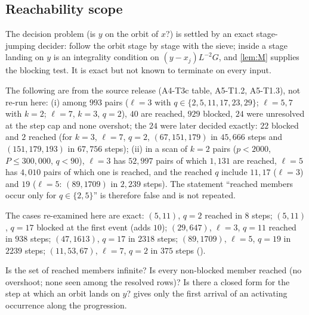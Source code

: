 \subsection{Reachability scope}
The decision problem (is $y$ on the orbit of $x$?) is settled by an exact stage-jumping decider: follow the orbit stage by stage with the sieve; inside a stage landing on $y$ is an integrality condition on $(y-x_j)L^{-2}G$, and \cref{lem:M} supplies the blocking test. It is exact but not known to terminate on every input.
\begin{proposition}\label{prop:reach}
The following are  from the source release (A4-T3c table, A5-T1.2, A5-T1.3), not re-run here:
(i) among $993$ pairs ($\ell=3$ with $q\in\{2,5,11,17,23,29\}$; $\ell=5,7$ with $k=2$; $\ell=7$, $k=3$, $q=2$), $40$ are reached, $929$ blocked, $24$ were unresolved at the step cap and none overshot; the $24$ were later decided exactly: $22$ blocked and $2$ reached (for $k=3$, $\ell=7$, $q=2$, $(67,151,179)$ in $45{,}666$ steps and $(151,179,193)$ in $67{,}756$ steps);
(ii) in a scan of $k=2$ pairs ($p<2000$, $P\le300{,}000$, $q<90$), $\ell=3$ has $52{,}997$ pairs of which $1{,}131$ are reached, $\ell=5$ has $4{,}010$ pairs of which one is reached, and the reached $q$ include $11,17$ ($\ell=3$) and $19$ ($\ell=5$: $(89,1709)$ in $2{,}239$ steps). The statement ``reached members occur only for $q\in\{2,5\}$'' is therefore false and is not repeated.
\end{proposition}
The cases re-examined here are exact: $(5,11)$, $q=2$ reached in $8$ steps; $(5,11)$, $q=17$ blocked at the first event (adds $10$); $(29,647)$, $\ell=3$, $q=11$ reached in $938$ steps; $(47,1613)$, $q=17$ in $2318$ steps; $(89,1709)$, $\ell=5$, $q=19$ in $2239$ steps; $(11,53,67)$, $\ell=7$, $q=2$ in $375$ steps ().
\begin{problem}\label{prob:A4T3f}
Is the set of reached members infinite? Is every non-blocked member reached (no overshoot; none seen among the resolved rows)? Is there a closed form for the step at which an orbit lands on $y$?  gives only the first arrival of an activating occurrence along the progression.
\end{problem}

